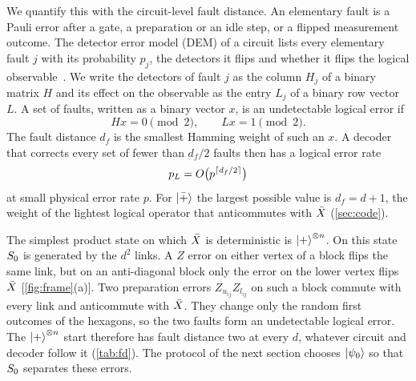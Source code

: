We quantify this with the circuit-level fault distance. An elementary fault is a Pauli error after a gate, a preparation or an idle step, or a flipped measurement outcome. The detector error model (DEM) of a circuit lists every elementary fault $j$ with its probability $p_j$, the detectors it flips and whether it flips the logical observable~\cite{gidney2021stim}. We write the detectors of fault $j$ as the column $H_j$ of a binary matrix $H$ and its effect on the observable as the entry $L_j$ of a binary row vector $L$. A set of faults, written as a binary vector $x$, is an undetectable logical error if
\begin{equation}
  Hx=0\pmod 2,\qquad Lx=1\pmod 2.
  \label{eq:undetectable}
\end{equation}
The fault distance $d_f$ is the smallest Hamming weight of such an $x$. A decoder that corrects every set of fewer than $d_f/2$ faults then has a logical error rate
\begin{equation}
  p_L=O\big(p^{\lceil d_f/2\rceil}\big)
  \label{eq:scaling}
\end{equation}
at small physical error rate $p$. For $\left|\bar{+}\right\rangle$ the largest possible value is $d_f=d+1$, the weight of the lightest logical operator that anticommutes with $\bar{X}$ (\autoref{sec:code}).

The simplest product state on which $\bar{X}$ is deterministic is $\left|+\right\rangle^{\otimes n}$. On this state $S_0$ is generated by the $d^2$ links. A $Z$ error on either vertex of a block flips the same link, but on an anti-diagonal block only the error on the lower vertex flips $\bar{X}$ [\autoref{fig:frame}(a)]. Two preparation errors $Z_{u_{ij}}Z_{l_{ij}}$ on such a block commute with every link and anticommute with $\bar{X}$. They change only the random first outcomes of the hexagons, so the two faults form an undetectable logical error. The $\left|+\right\rangle^{\otimes n}$ start therefore has fault distance two at every $d$, whatever circuit and decoder follow it (\autoref{tab:fd}). The protocol of the next section chooses $\left|\psi_0\right\rangle$ so that $S_0$ separates these errors.
